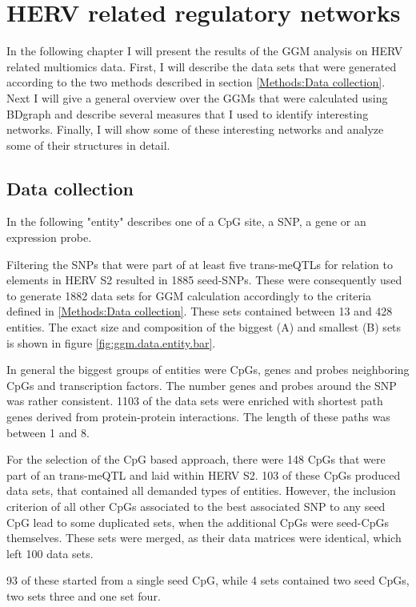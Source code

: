 \documentclass[a4paper,12pt,twoside,openright]{report}
\begin{document}
\section{HERV related regulatory networks}
\label{Results:HERV related regulatory networks}
In the following chapter I will present the results of the GGM analysis on HERV related multiomics data. First, I will describe the data sets that were generated according to the two methods described in section \ref{Methods:Data collection}. Next I will give a general overview over the GGMs that were calculated using BDgraph and describe several measures that I used to identify interesting networks. Finally, I will show some of these interesting networks and analyze some of their structures in detail.

\subsection{Data collection}
\label{Results:Data collection}
In the following "entity" describes one of a CpG site, a SNP, a gene or an expression probe.

Filtering the SNPs that were part of at least five trans-meQTLs for relation to elements in HERV S2 resulted in 1885 seed-SNPs. These were consequently used to generate 1882 data sets for GGM calculation accordingly to the criteria defined in \ref{Methods:Data collection}. These sets contained between 13 and 428 entities. The exact size and composition of the biggest (A) and smallest (B) sets is shown in figure \ref{fig:ggm.data.entity.bar}.

In general the biggest groups of entities were CpGs, genes and probes neighboring CpGs and transcription factors. The number genes and probes around the SNP was rather consistent. 1103 of the data sets were enriched with shortest path genes derived from protein-protein interactions. The length of these paths was between 1 and 8. 

For the selection of the CpG based approach, there were 148 CpGs that were part of an trans-meQTL and laid within HERV S2. 103 of these CpGs produced data sets, that contained all demanded types of entities. However, the inclusion criterion of all other CpGs associated to the best associated SNP to any seed CpG lead to some duplicated sets, when the additional CpGs were seed-CpGs themselves. These sets were merged, as their data matrices were identical, which left 100 data sets. 

93 of these started from a single seed CpG, while 4 sets contained two seed CpGs, two sets three and one set four. 
\end{document}
